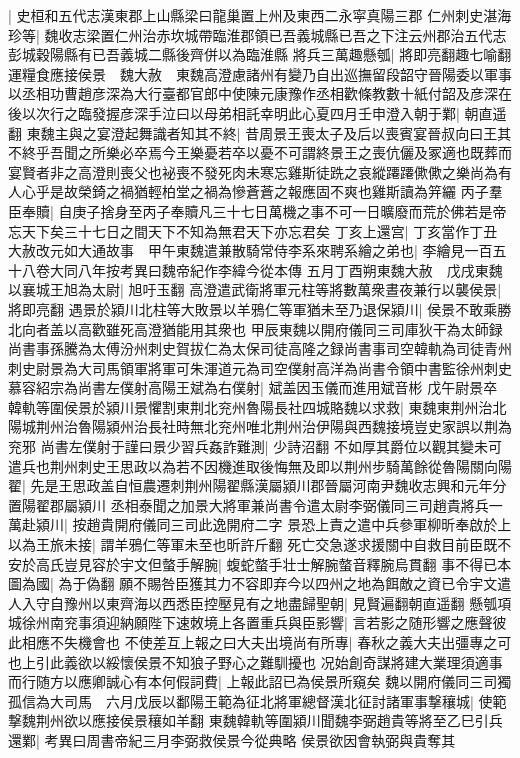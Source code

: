 |{
	史桓和五代志漢東郡上山縣梁曰龍巢置上州及東西二永寜真陽三郡}
仁州刺史湛海珍等|{
	魏收志梁置仁州治赤坎城帶臨淮郡領已吾義城縣已吾之下注云州郡治五代志彭城穀陽縣有已吾義城二縣後齊併以為臨淮縣}
將兵三萬趣懸瓠|{
	將即亮翻趣七喻翻}
運糧食應接侯景　魏大赦　東魏高澄慮諸州有變乃自出巡撫留段韶守晉陽委以軍事以丞相功曹趙彦深為大行臺都官郎中使陳元康豫作丞相歡條教數十紙付韶及彦深在後以次行之臨發握彦深手泣曰以母弟相託幸明此心夏四月壬申澄入朝于鄴|{
	朝直遥翻}
東魏主與之宴澄起舞識者知其不終|{
	昔周景王喪太子及后以喪賓宴晉叔向曰王其不終乎吾聞之所樂必卒焉今王樂憂若卒以憂不可謂終景王之喪伉儷及冢適也既葬而宴賢者非之高澄則喪父也袐喪不發死肉未寒忘雞斯徒跣之哀縱蹮蹮僛僛之樂尚為有人心乎是故榮錡之禍猶輕柏堂之禍為慘蒼蒼之報應固不爽也雞斯讀為笄纚}
丙子羣臣奉贖|{
	自庚子捨身至丙子奉贖凡三十七日萬機之事不可一日曠廢而荒於佛若是帝忘天下矣三十七日之間天下不知為無君天下亦忘君矣}
丁亥上還宫|{
	丁亥當作丁丑}
大赦改元如大通故事　甲午東魏遣兼散騎常侍李系來聘系繪之弟也|{
	李繪見一百五十八卷大同八年按考異曰魏帝紀作李緯今從本傳}
五月丁酉朔東魏大赦　戊戌東魏以襄城王旭為太尉|{
	旭吁玉翻}
高澄遣武衛將軍元柱等將數萬衆晝夜兼行以襲侯景|{
	將即亮翻}
遇景於潁川北柱等大敗景以羊鴉仁等軍猶未至乃退保潁川|{
	侯景不敢乘勝北向者盖以高歡雖死高澄猶能用其衆也}
甲辰東魏以開府儀同三司庫狄干為太師録尚書事孫騰為太傅汾州刺史賀拔仁為太保司徒高隆之録尚書事司空韓軌為司徒青州刺史尉景為大司馬領軍將軍可朱渾道元為司空僕射高洋為尚書令領中書監徐州刺史慕容紹宗為尚書左僕射高陽王斌為右僕射|{
	斌盖因玉儀而進用斌音彬}
戊午尉景卒　韓軌等圍侯景於潁川景懼割東荆北兖州魯陽長社四城賂魏以求救|{
	東魏東荆州治北陽城荆州治魯陽潁州治長社時無北兖州唯北荆州治伊陽與西魏接境豈史家誤以荆為兖邪}
尚書左僕射于謹曰景少習兵姦詐難測|{
	少詩沼翻}
不如厚其爵位以觀其變未可遣兵也荆州刺史王思政以為若不因機進取後悔無及即以荆州步騎萬餘從魯陽關向陽翟|{
	先是王思政盖自恒農遷刺荆州陽翟縣漢屬潁川郡晉屬河南尹魏收志興和元年分置陽翟郡屬潁川}
丞相泰聞之加景大將軍兼尚書令遣太尉李弼儀同三司趙貴將兵一萬赴潁川|{
	按趙貴開府儀同三司此逸開府二字}
景恐上責之遣中兵參軍柳昕奉啟於上以為王旅未接|{
	謂羊鴉仁等軍未至也昕許斤翻}
死亡交急遂求援關中自救目前臣既不安於高氏豈見容於宇文但螫手解腕|{
	蝮蛇螫手壮士解腕螫音釋腕烏貫翻}
事不得已本圖為國|{
	為于偽翻}
願不賜咎臣獲其力不容即弃今以四州之地為餌敵之資已令宇文遣人入守自豫州以東齊海以西悉臣控壓見有之地盡歸聖朝|{
	見賢遍翻朝直遥翻}
懸瓠項城徐州南兖事須迎納願陛下速敇境上各置重兵與臣影響|{
	言若影之随形響之應聲彼此相應不失機會也}
不使差互上報之曰大夫出境尚有所專|{
	春秋之義大夫出彊專之可也上引此義欲以綏懷侯景不知狼子野心之難馴擾也}
况始創奇謀將建大業理須適事而行随方以應卿誠心有本何假詞費|{
	上報此詔已為侯景所窺矣}
魏以開府儀同三司獨孤信為大司馬　六月戊辰以鄱陽王範為征北將軍總督漢北征討諸軍事撃穰城|{
	使範撃魏荆州欲以應接侯景穰如羊翻}
東魏韓軌等圍潁川聞魏李弼趙貴等將至乙巳引兵還鄴|{
	考異曰周書帝紀三月李弼救侯景今從典略}
侯景欲因會執弼與貴奪其

